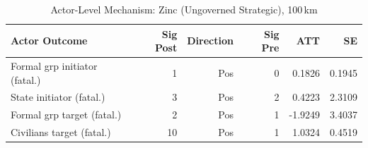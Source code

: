 \begin{longtable}{lrrrrr}
\caption{Actor-Level Mechanism: Zinc (Ungoverned Strategic), 100\,km} \label{tab:mech_zinc} \\
\toprule
\textbf{Actor Outcome} & \textbf{Sig Post} & \textbf{Direction} & \textbf{Sig Pre} & \textbf{ATT} & \textbf{SE} \\
\midrule
\endfirsthead
\bottomrule
\endlastfoot
Formal grp initiator (fatal.) & 1 & Pos & 0 & 0.1826 & 0.1945 \\
State initiator (fatal.) & 3 & Pos & 2 & 0.4223 & 2.3109 \\
Formal grp target (fatal.) & 2 & Pos & 1 & -1.9249 & 3.4037 \\
Civilians target (fatal.) & 10 & Pos & 1 & 1.0324 & 0.4519 \\
\end{longtable}
